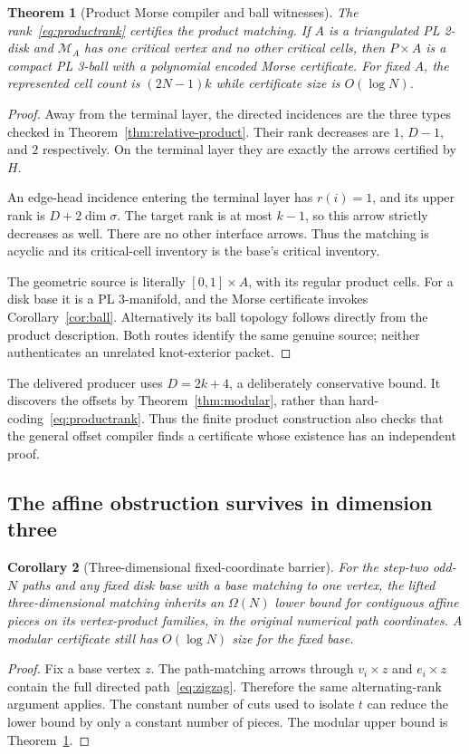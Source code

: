 \documentclass[11pt,letterpaper]{article}
\newtheorem{theorem}{Theorem}[section]
\newtheorem{corollary}[theorem]{Corollary}
\theoremstyle{definition}
\theoremstyle{remark}\newtheorem{remark}[theorem]{Remark}
\begin{document}
\begin{theorem}[Product Morse compiler and ball witnesses]
\label{thm:product}
The rank~\eqref{eq:productrank} certifies the product matching. If $A$ is a triangulated PL 2-disk and $\mathcal M_A$ has one critical vertex and no other critical cells, then $P\times A$ is a compact PL 3-ball with a polynomial encoded Morse certificate. For fixed $A$, the represented cell count is $(2N-1)k$ while certificate size is $O(\log N)$.
\end{theorem}
\begin{proof}
Away from the terminal layer, the directed incidences are the three types checked in Theorem~\ref{thm:relative-product}. Their rank decreases are $1$, $D-1$, and $2$ respectively. On the terminal layer they are exactly the arrows certified by $H$.

An edge-head incidence entering the terminal layer has $r(i)=1$, and its upper rank is $D+2\dim\sigma$. The target rank is at most $k-1$, so this arrow strictly decreases as well. There are no other interface arrows. Thus the matching is acyclic and its critical-cell inventory is the base's critical inventory.

The geometric source is literally $[0,1]\times A$, with its regular product cells. For a disk base it is a PL 3-manifold, and the Morse certificate invokes Corollary~\ref{cor:ball}. Alternatively its ball topology follows directly from the product description. Both routes identify the same genuine source; neither authenticates an unrelated knot-exterior packet.
\end{proof}

The delivered producer uses $D=2k+4$, a deliberately conservative bound. It discovers the offsets by Theorem~\ref{thm:modular}, rather than hard-coding~\eqref{eq:productrank}. Thus the finite product construction also checks that the general offset compiler finds a certificate whose existence has an independent proof.

\subsection{The affine obstruction survives in dimension three}

\begin{corollary}[Three-dimensional fixed-coordinate barrier]
\label{cor:3dbarrier}
For the step-two odd-$N$ paths and any fixed disk base with a base matching to one vertex, the lifted three-dimensional matching inherits an $\Omega(N)$ lower bound for contiguous affine pieces on its vertex-product families, in the original numerical path coordinates. A modular certificate still has $O(\log N)$ size for the fixed base.
\end{corollary}
\begin{proof}
Fix a base vertex $z$. The path-matching arrows through $v_i\times z$ and $e_i\times z$ contain the full directed path~\eqref{eq:zigzag}. Therefore the same alternating-rank argument applies. The constant number of cuts used to isolate $t$ can reduce the lower bound by only a constant number of pieces. The modular upper bound is Theorem~\ref{thm:product}.
\end{proof}
\end{document}
